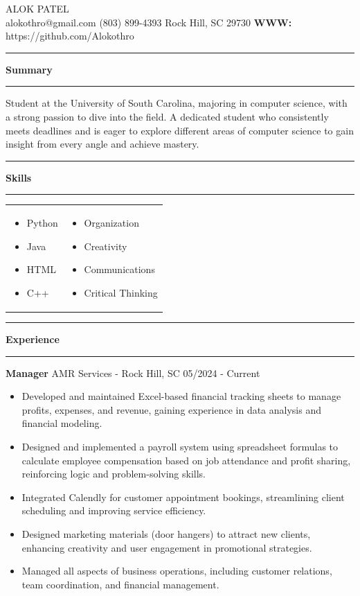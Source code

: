 \documentclass[10pt, letterpaper]{article}
\newcommand{\ressection}[1]{%
  \vspace{6pt}
  \begin{center}
    \rule{0.3\textwidth}{0.4pt}\quad\textbf{#1}\quad\rule{0.3\textwidth}{0.4pt}
  \end{center}
  \vspace{2pt}
}
\newcommand{\expentry}[3]{%
  \begin{center}
    \textbf{#1} \textbar{} #2 \textbar{} #3
  \end{center}
}
\begin{document}
\begin{center}
  {\fontsize{26}{30}\selectfont\textsc{\MakeUppercase{Alok Patel}}}\\[5pt]
  alokothro@gmail.com \quad\textbar\quad (803) 899-4393 \quad\textbar\quad Rock Hill, SC 29730 \quad\textbar\quad \textbf{WWW:} https://github.com/Alokothro
\end{center}

\ressection{Summary}

\noindent Student at the University of South Carolina, majoring in computer science, with a strong passion to dive into the field. A dedicated student who consistently meets deadlines and is eager to explore different areas of computer science to gain insight from every angle and achieve mastery.

\ressection{Skills}

\vspace{2pt}
\begin{tabularx}{\textwidth}{X X}
  \begin{itemize}[leftmargin=1.5em, itemsep=1pt, topsep=0pt]
    \item Python
    \item Java
    \item HTML
    \item C++
  \end{itemize}
  &
  \begin{itemize}[leftmargin=1.5em, itemsep=1pt, topsep=0pt]
    \item Organization
    \item Creativity
    \item Communications
    \item Critical Thinking
  \end{itemize}
\end{tabularx}

\ressection{Experience}

\expentry{Manager}{AMR Services - Rock Hill, SC}{05/2024 - Current}

\begin{itemize}[leftmargin=1.5em, itemsep=1pt, topsep=1pt]
  \item Developed and maintained Excel-based financial tracking sheets to manage profits, expenses, and revenue, gaining experience in data analysis and financial modeling.
  \item Designed and implemented a payroll system using spreadsheet formulas to calculate employee compensation based on job attendance and profit sharing, reinforcing logic and problem-solving skills.
  \item Integrated Calendly for customer appointment bookings, streamlining client scheduling and improving service efficiency.
  \item Designed marketing materials (door hangers) to attract new clients, enhancing creativity and user engagement in promotional strategies.
  \item Managed all aspects of business operations, including customer relations, team coordination, and financial management.
\end{itemize}
\end{document}
